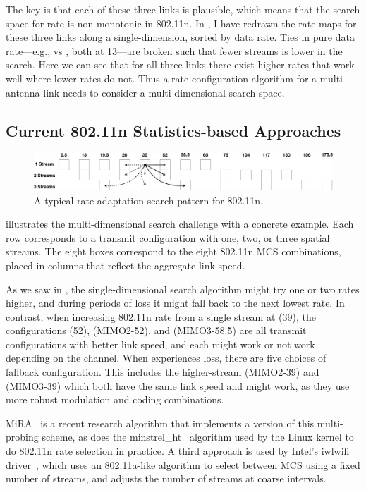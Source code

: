 The key is that each of these three links is plausible, which means that the search space for rate is non-monotonic in 802.11n. In , I have redrawn the rate maps for these three links along a single-dimension, sorted by data rate. Ties in pure data rate---e.g.,  vs , both at 13\Mbps---are broken such that fewer streams is lower in the search. Here we can see that for all three links there exist higher rates that work well where lower rates do not. Thus a rate configuration algorithm for a multi-antenna link needs to consider a multi-dimensional search space.

\subsection{Current 802.11n Statistics-based Approaches}
\begin{figure}[t]
      \centering
      \includegraphics[width=\textwidth]{figures/approach_figs/search_11n.pdf}
      \caption[Rate adaptation search pattern for 802.11n]{\label{fig:search_11n}A typical rate adaptation search pattern for 802.11n.}
\end{figure}
 illustrates the multi-dimensional search challenge with a concrete example. Each row corresponds to a transmit configuration with one, two, or three spatial streams. The eight boxes correspond to the eight 802.11n MCS combinations, placed in columns that reflect the aggregate link speed.

As we saw in , the single-dimensional search algorithm might try one or two rates higher, and during periods of loss it might fall back to the next lowest rate. In contrast, when increasing 802.11n rate from a single stream at  (39\Mbps), the configurations  (52\Mbps),  (MIMO2-52\Mbps), and  (MIMO3-58.5\Mbps) are all transmit configurations with better link speed, and each might work or not work depending on the channel. When  experiences loss, there are five choices of fallback configuration. This includes the higher-stream  (MIMO2-39\Mbps) and  (MIMO3-39\Mbps) which both have the same link speed and might work, as they use more robust modulation and coding combinations.

MiRA~\cite{Pefkianakis_MiRA} is a recent research algorithm that implements a version of this multi-probing scheme, as does the minstrel\_ht~\cite{minstrel_ht} algorithm used by the Linux kernel to do 802.11n rate selection in practice. A third approach is used by Intel's iwlwifi driver~\cite{iwlwifi}, which uses an 802.11a-like algorithm to select between MCS using a fixed number of streams, and adjusts the number of streams at coarse intervals.

